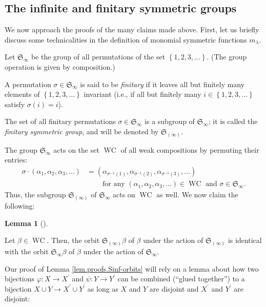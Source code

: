\documentclass[numbers=enddot,12pt,final,onecolumn,notitlepage]{scrartcl}%
\theoremstyle{definition}
\newtheorem{lem}[theo]{Lemma}
\newenvironment{lemma}[1][]
{\begin{lem}[#1]\begin{leftbar}}
{\end{leftbar}\end{lem}}
\newcommand{\silentsubsection}{\subsection}
\newenvironment{verlong}{}{}
\begin{document}
\begin{verlong}
\silentsubsection{\label{subsect.proofs.Sinf}The infinite and finitary
symmetric groups}

We now approach the proofs of the many claims made above. First, let us
briefly discuss some technicalities in the definition of monomial symmetric
functions $m_{\lambda}$.

Let $\mathfrak{S}_{\infty}$ be the group of all permutations of the set
$\left\{  1,2,3,\ldots\right\}  $. (The group operation is given by composition.)

A permutation $\sigma\in\mathfrak{S}_{\infty}$ is said to be \emph{finitary}
if it leaves all but finitely many elements of $\left\{  1,2,3,\ldots\right\}
$ invariant (i.e., if all but finitely many $i\in\left\{  1,2,3,\ldots
\right\}  $ satisfy $\sigma\left(  i\right)  =i$).

The set of all finitary permutations $\sigma\in\mathfrak{S}_{\infty}$ is a
subgroup of $\mathfrak{S}_{\infty}$; it is called the \emph{finitary symmetric
group}, and will be denoted by $\mathfrak{S}_{\left(  \infty\right)  }$.

The group $\mathfrak{S}_{\infty}$ acts on the set $\operatorname*{WC}$ of all
weak compositions by permuting their entries:%
\begin{align*}
\sigma\cdot\left(  \alpha_{1},\alpha_{2},\alpha_{3},\ldots\right)   &
=\left(  \alpha_{\sigma^{-1}\left(  1\right)  },\alpha_{\sigma^{-1}\left(
2\right)  },\alpha_{\sigma^{-1}\left(  3\right)  },\ldots\right) \\
&  \ \ \ \ \ \ \ \ \ \ \text{for any }\left(  \alpha_{1},\alpha_{2},\alpha
_{3},\ldots\right)  \in\operatorname*{WC}\text{ and }\sigma\in\mathfrak{S}%
_{\infty}.
\end{align*}
Thus, the subgroup $\mathfrak{S}_{\left(  \infty\right)  }$ of $\mathfrak{S}%
_{\infty}$ acts on $\operatorname*{WC}$ as well. We now claim the following:

\begin{lemma}
\label{lem.proofs.Sinf-orbits}Let $\beta\in\operatorname*{WC}$. Then, the
orbit $\mathfrak{S}_{\left(  \infty\right)  }\beta$ of $\beta$ under the
action of $\mathfrak{S}_{\left(  \infty\right)  }$ is identical with the orbit
$\mathfrak{S}_{\infty}\beta$ of $\beta$ under the action of $\mathfrak{S}%
_{\infty}$.
\end{lemma}

Our proof of Lemma \ref{lem.proofs.Sinf-orbits} will rely on a lemma about how
two bijections $\varphi:X\rightarrow X^{\prime}$ and $\psi:Y\rightarrow
Y^{\prime}$ can be combined (\textquotedblleft glued
together\textquotedblright) to a bijection $X\cup Y\rightarrow X^{\prime}\cup
Y^{\prime}$ as long as $X$ and $Y$ are disjoint and $X^{\prime}$ and
$Y^{\prime}$ are disjoint:


\end{verlong}
\end{document}
